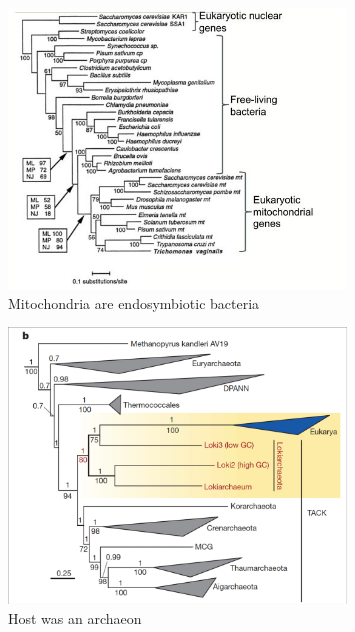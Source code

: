 \documentclass[]{article}
\begin{document}
\begin{figure}[H]
	\begin{center}
		\caption[Mitochondria are endosymbiotic bacteria]{Mitochondria are endosymbiotic bacteria\cite{germot1996presence}} 	\label{fig:Mitochondria:are:endosymbiotic:bacteria}
		\includegraphics[width=0.8\textwidth]{MitochondriaEndosymbiotic}
	\end{center}
\end{figure}

\begin{figure}[H]
	\caption[Host was an archaeon]{Host was an archaeon\cite{spang2015complex}}
	\label{fig:host:archaeon}
	\includegraphics[width=0.8\textwidth]{HostArchaeon}
\end{figure}
\end{document}
